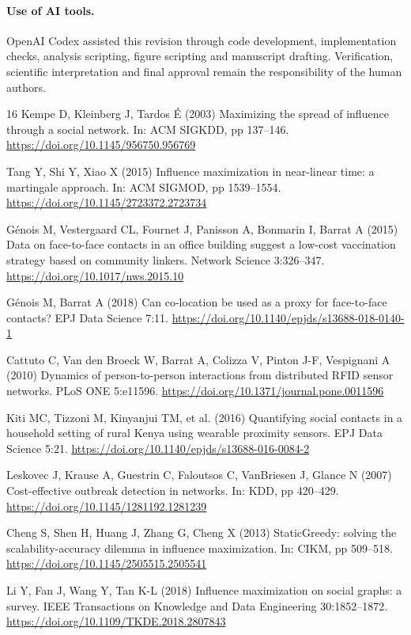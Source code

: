 \documentclass[smallextended]{svjour3}
\begin{document}
\paragraph{Use of AI tools.} OpenAI Codex assisted this revision through code development, implementation checks, analysis scripting, figure scripting and manuscript drafting. Verification, scientific interpretation and final approval remain the responsibility of the human authors.
\begin{thebibliography}{16}
 Kempe D, Kleinberg J, Tardos É (2003) Maximizing the spread of influence through a social network. In: ACM SIGKDD, pp 137--146. \url{https://doi.org/10.1145/956750.956769}

 Tang Y, Shi Y, Xiao X (2015) Influence maximization in near-linear time: a martingale approach. In: ACM SIGMOD, pp 1539--1554. \url{https://doi.org/10.1145/2723372.2723734}

 Génois M, Vestergaard CL, Fournet J, Panisson A, Bonmarin I, Barrat A (2015) Data on face-to-face contacts in an office building suggest a low-cost vaccination strategy based on community linkers. Network Science 3:326--347. \url{https://doi.org/10.1017/nws.2015.10}

 Génois M, Barrat A (2018) Can co-location be used as a proxy for face-to-face contacts? EPJ Data Science 7:11. \url{https://doi.org/10.1140/epjds/s13688-018-0140-1}

 Cattuto C, Van den Broeck W, Barrat A, Colizza V, Pinton J-F, Vespignani A (2010) Dynamics of person-to-person interactions from distributed RFID sensor networks. PLoS ONE 5:e11596. \url{https://doi.org/10.1371/journal.pone.0011596}

 Kiti MC, Tizzoni M, Kinyanjui TM, et al. (2016) Quantifying social contacts in a household setting of rural Kenya using wearable proximity sensors. EPJ Data Science 5:21. \url{https://doi.org/10.1140/epjds/s13688-016-0084-2}

 Leskovec J, Krause A, Guestrin C, Faloutsos C, VanBriesen J, Glance N (2007) Cost-effective outbreak detection in networks. In: KDD, pp 420--429. \url{https://doi.org/10.1145/1281192.1281239}

 Cheng S, Shen H, Huang J, Zhang G, Cheng X (2013) StaticGreedy: solving the scalability-accuracy dilemma in influence maximization. In: CIKM, pp 509--518. \url{https://doi.org/10.1145/2505515.2505541}

 Li Y, Fan J, Wang Y, Tan K-L (2018) Influence maximization on social graphs: a survey. IEEE Transactions on Knowledge and Data Engineering 30:1852--1872. \url{https://doi.org/10.1109/TKDE.2018.2807843}


\end{thebibliography}
\end{document}
